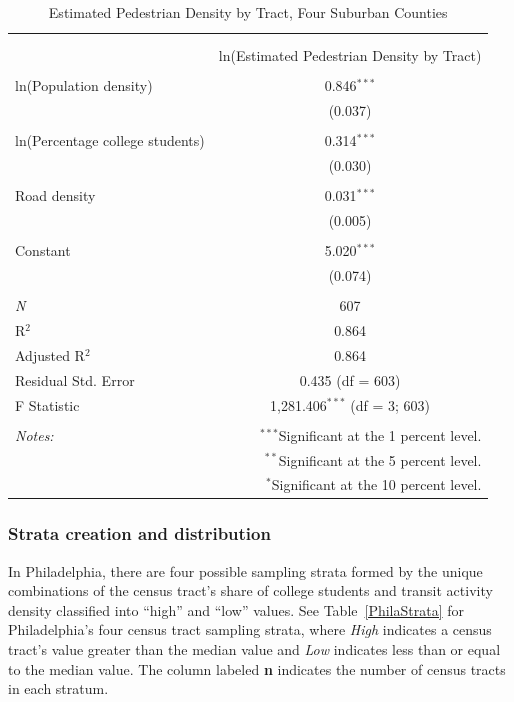 \documentclass[paper=letterpaper, fontsize=11pt]{scrartcl}
\begin{document}
\FloatBarrier
\begin{table}[!htbp] \centering 
	\caption{Estimated Pedestrian Density by Tract, Four Suburban Counties} 
	\label{suburb-reg} 
	\begin{tabular}{@{\extracolsep{5pt}}lc} 
		\\[-1.8ex]\hline 
		\hline \\[-1.8ex] 
		\\[-1.8ex] & ln(Estimated Pedestrian Density by Tract) \\ 
		\hline \\[-1.8ex] 
		ln(Population density) & 0.846$^{***}$ \\ 
		& (0.037) \\ 
		& \\ 
		ln(Percentage college students) & 0.314$^{***}$ \\ 
		& (0.030) \\ 
		& \\ 
		Road density & 0.031$^{***}$ \\ 
		& (0.005) \\ 
		& \\ 
		Constant & 5.020$^{***}$ \\ 
		& (0.074) \\ 
		& \\ 
		\textit{N} & 607 \\ 
		R$^{2}$ & 0.864 \\ 
		Adjusted R$^{2}$ & 0.864 \\ 
		Residual Std. Error & 0.435 (df = 603) \\ 
		F Statistic & 1,281.406$^{***}$ (df = 3; 603) \\ 
		\hline 
		\hline \\[-1.8ex] 
		\textit{Notes:} & \multicolumn{1}{r}{$^{***}$Significant at the 1 percent level.} \\ 
		& \multicolumn{1}{r}{$^{**}$Significant at the 5 percent level.} \\ 
		& \multicolumn{1}{r}{$^{*}$Significant at the 10 percent level.} \\ 
	\end{tabular} 
\end{table}
\FloatBarrier

\subsubsection{Strata creation and distribution}
In Philadelphia, there are four possible sampling strata formed by the unique combinations of the census tract's share of college students and transit activity density classified into ``high'' and ``low'' values. See Table~\ref{PhilaStrata} for Philadelphia's four census tract sampling strata, where \textit{High} indicates a census tract's value greater than the median value and \textit{Low} indicates less than or equal to the median value. The column labeled \textbf{n} indicates the number of census tracts in each stratum.
\end{document}
